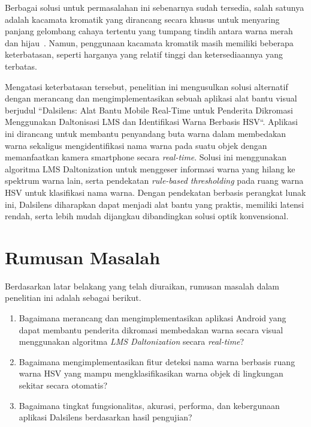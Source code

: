 
\setlength{\parindent}{2em} Berbagai solusi untuk permasalahan ini sebenarnya sudah tersedia, salah satunya adalah kacamata kromatik yang dirancang secara khusus untuk menyaring panjang gelombang cahaya tertentu yang tumpang tindih antara warna merah dan hijau~\parencite{patterson2022color}.
Namun, penggunaan kacamata kromatik masih memiliki beberapa keterbatasan, seperti harganya yang relatif tinggi dan ketersediaannya yang terbatas.

\setlength{\parindent}{2em} Mengatasi keterbatasan tersebut, penelitian ini mengusulkan solusi alternatif dengan merancang dan mengimplementasikan sebuah aplikasi alat bantu visual berjudul ``Dalsilens: Alat Bantu Mobile Real-Time untuk Penderita Dikromasi Menggunakan Daltonisasi LMS dan Identifikasi Warna Berbasis HSV``.
Aplikasi ini dirancang untuk membantu penyandang buta warna dalam membedakan warna sekaligus mengidentifikasi nama warna pada suatu objek dengan memanfaatkan kamera smartphone secara \textit{real-time}.
Solusi ini menggunakan algoritma LMS Daltonization untuk menggeser informasi warna yang hilang ke spektrum warna lain, serta pendekatan \textit{rule-based thresholding} pada ruang warna HSV untuk klasifikasi nama warna.
Dengan pendekatan berbasis perangkat lunak ini, Dalsilens diharapkan dapat menjadi alat bantu yang praktis, memiliki latensi rendah, serta lebih mudah dijangkau dibandingkan solusi optik konvensional.


\section{Rumusan Masalah}

Berdasarkan latar belakang yang telah diuraikan, rumusan masalah dalam penelitian ini adalah sebagai berikut.
\begin{enumerate}
  \item Bagaimana merancang dan mengimplementasikan aplikasi Android yang dapat membantu penderita dikromasi membedakan warna secara visual menggunakan algoritma \textit{LMS Daltonization} secara \textit{real-time}?
  \item Bagaimana mengimplementasikan fitur deteksi nama warna berbasis ruang warna HSV yang mampu mengklasifikasikan warna objek di lingkungan sekitar secara otomatis?
  \item Bagaimana tingkat fungsionalitas, akurasi, performa, dan kebergunaan aplikasi Dalsilens berdasarkan hasil pengujian?
\end{enumerate}

